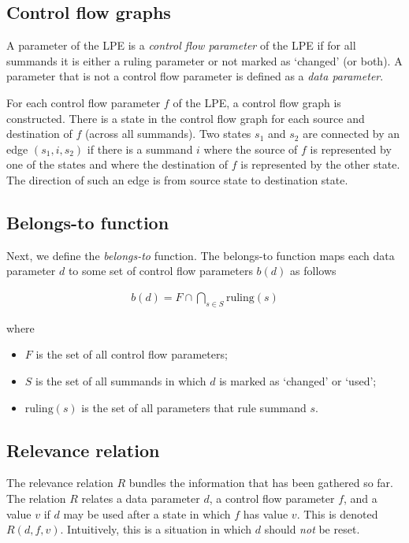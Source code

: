\subsection{Control flow graphs}

A parameter of the LPE is a \emph{control flow parameter} of the LPE if for all summands it is either a ruling parameter or not marked as `changed' (or both).
A parameter that is not a control flow parameter is defined as a \emph{data parameter}.

\vspace{1mm}

For each control flow parameter $f$ of the LPE, a control flow graph is constructed.
There is a state in the control flow graph for each source and destination of $f$ (across all summands).
Two states $s_1$ and $s_2$ are connected by an edge $(s_1, i, s_2)$ if there is a summand $i$ where the source of $f$ is represented by one of the states and where the destination of $f$ is represented by the other state.
The direction of such an edge is from source state to destination state.

\subsection{Belongs-to function}

Next, we define the \emph{belongs-to} function.
The belongs-to function maps each data parameter $d$ to some set of control flow parameters $b(d)$ as follows

\begin{align*}
b(d) = F \cap \bigcap\limits_{s \in S}^{} \text{ruling}(s)
\end{align*}

where

\begin{itemize}
\item $F$ is the set of all control flow parameters;
\item $S$ is the set of all summands in which $d$ is marked as `changed' or `used';
\item $\text{ruling}(s)$ is the set of all parameters that rule summand $s$.
\end{itemize}

\clearpage
\subsection{Relevance relation}

The relevance relation $R$ bundles the information that has been gathered so far.
The relation $R$ relates a data parameter $d$, a control flow parameter $f$, and a value $v$ if $d$ may be used after a state in which $f$ has value $v$.
This is denoted $R(d, f, v)$.
Intuitively, this is a situation in which $d$ should \emph{not} be reset.

